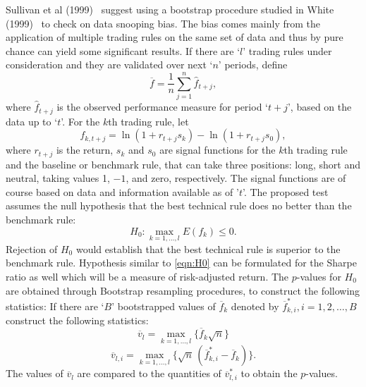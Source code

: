 Sullivan et al (1999)~\cite{sullivan1999data} suggest using a bootstrap procedure studied in White (1999)~\cite{white1999} to check on data snooping bias. The bias comes mainly from the application of multiple trading rules on the same set of data and thus by pure chance can yield some significant results. If there are `$l$' trading rules under consideration and they are validated over next `$n$' periods, define
	\begin{equation} \label{eqn:barf}
	\overline{f}= \frac{1}{n} \sum_{j=1}^n\hat{f}_{t+j},
	\end{equation}
where $\hat{f}_{t+j}$ is the observed performance measure for period `$t+j$', based on the data up to `$t$'. For the $k$th trading rule, let
	\begin{equation} \label{eqn:fktj}
	f_{k,t+j}= \ln(1+r_{t+j} s_k) - \ln(1+r_{t+j} s_0),
	\end{equation}
where $r_{t+j}$ is the return, $s_k$ and $s_0$ are signal functions for the $k$th trading rule and the baseline or benchmark rule, that can take three positions: long, short and neutral, taking values 1, $-1$, and zero, respectively. The signal functions are of course based on data and information available as of '$t$'. The proposed test assumes the null hypothesis that the best technical rule does no better than the benchmark rule:
	\begin{equation} \label{eqn:H0}
	H_0: \max_{k=1,\ldots,l} E(f_k) \leq 0.
	\end{equation}
Rejection of $H_0$ would establish that the best technical rule is superior to the benchmark rule. Hypothesis similar to \eqref{eqn:H0} can be formulated for the Sharpe ratio as well which will be a measure of risk-adjusted return. The $p$-values for $H_0$ are obtained through Bootstrap resampling procedures, to construct the following statistics:
If there are `$B$' bootstrapped values of $\overline{f}_k$ denoted by $\overline{f}_{k,i}^*, i=1,2,\ldots,B$ construct the following statistics:
	\begin{equation} \label{eqn:linev}
	\overline{v}_l = \max_{k=1,\ldots,l} \{ \overline{f}_k \sqrt{n} \}
	\end{equation}
	\begin{equation} \label{eqn:linevli}
	\overline{v}_{l,i} = \max_{k=1,\ldots,l} \{\sqrt{n}\,(\overline{f}_{k,i}^* - \overline{f}_k) \}.
	\end{equation}
The values of $\overline{v}_l$ are compared to the quantities of $\overline{v}_{l,i}^*$ to obtain the $p$-values.


